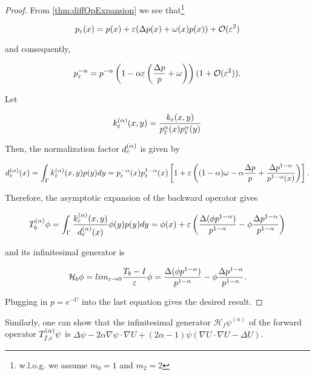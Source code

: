 \begin{proof}
From \ref{thm:diffOpExpansion} we see that\footnote{w.l.o.g. we assume $m_0=1$ and $m_2=2$} 

\begin{equation*}
p_\varepsilon(x)=p(x)+\varepsilon (\Delta p(x)+ \omega(x)p(x))+\mathcal{O}(\varepsilon^2)
\end{equation*}

and consequently,

\begin{equation*}
p_\varepsilon^{-\alpha}=p^{-\alpha}\left(1-\alpha\varepsilon \left(\frac{\Delta p}{p}+\omega \right) \right)(1+\mathcal{O}(\varepsilon^2)).
\end{equation*}

Let

\begin{equation*}
k_\varepsilon^{(\alpha)}(x,y)=\frac{k_\varepsilon(x,y)}{p_\varepsilon^{\alpha}(x)p_\varepsilon^{\alpha}(y)}
\end{equation*}

Then, the normalization factor $d_\varepsilon^{(\alpha)}$ is given by

\begin{equation*}
d_\varepsilon^{(\alpha)}(x)=\int_\Gamma k_\varepsilon^{(\alpha)}(x,y)p(y)dy = 
p_\varepsilon^{-\alpha}(x)p_\varepsilon^{1-\alpha}(x)\left[1+\varepsilon \left((1-\alpha)\omega - \alpha\frac{\Delta p}{p}+\frac{\Delta p^{1-\alpha}}{p^{1-\alpha}(x)} \right) \right].
\end{equation*}

Therefore, the asymptotic expansion of the backward operator gives

\begin{equation*}
T_b^{(\alpha)}\phi = \int_\Gamma \frac{k_\varepsilon^{(\alpha)}(x,y)}{d_\varepsilon^{(\alpha)}(x)}\phi(y)p(y)dy = \phi(x) + \varepsilon\left(\frac{\Delta(\phi p^{1-\alpha})}{p^{1-\alpha}}-\phi \frac{\Delta p^{1-\alpha}}{p^{1-\alpha}} \right)
\end{equation*}

and its infinitesimal generator is 

\begin{equation*}
\mathcal{H}_b\phi =
lim_{\varepsilon\rightarrow 0}\frac{T_b-I}{\varepsilon}\phi =
\frac{\Delta(\phi p^{1-\alpha})}{p^{1-\alpha}}-\phi \frac{\Delta p^{1-\alpha}}{p^{1-\alpha}}.
\end{equation*}

Plugging in $p=e^{-U}$ into the last equation gives the desired result.
\end{proof}

Similarly, one can show that the infinitesimal generator $\mathcal{H}_f\psi^{(\alpha)}$ of the forward operator $T_{f,\varepsilon}^{(\alpha)}\psi$ is $\Delta\psi - 2\alpha\nabla\psi\cdot\nabla U + (2\alpha - 1)\psi(\nabla U\cdot\nabla U - \Delta U)$.


















